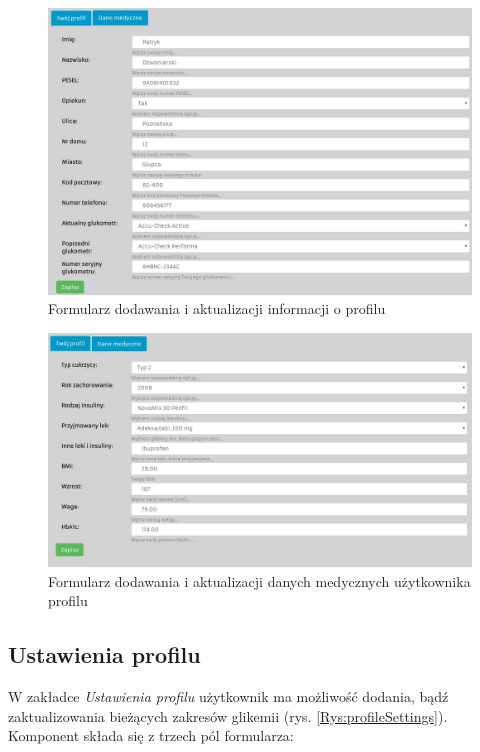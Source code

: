 \begin{figure}[h]
	\centering\includegraphics[scale=0.5]{images/yourprofile.jpg}
	\caption{Formularz dodawania i aktualizacji informacji o profilu}
	\label{Rys:yourProfile}
\end{figure}

\newpage

\begin{figure}[h]
	\centering\includegraphics[scale=0.5]{images/medical_data.jpg}
	\caption{Formularz dodawania i aktualizacji danych medycznych użytkownika profilu}
	\label{Rys:medicalData}
\end{figure}

\subsection{Ustawienia profilu}
W zakładce \textit{Ustawienia profilu} użytkownik ma możliwość dodania, bądź zaktualizowania bieżących zakresów glikemii (rys. \ref{Rys:profileSettings}). Komponent składa się z trzech pól formularza:

